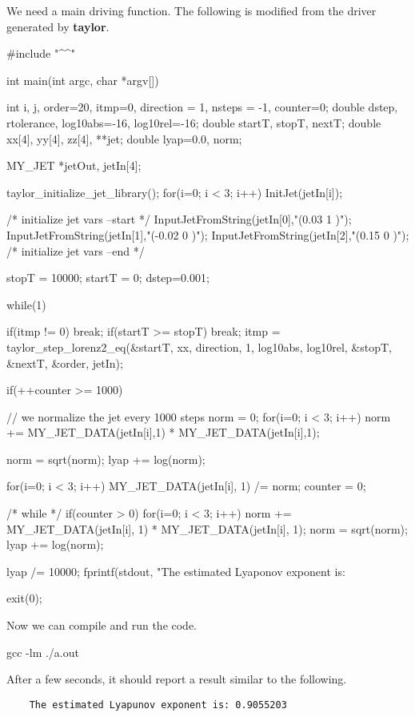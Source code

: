 \documentclass[10pt]{article}
\theoremstyle{remark}
\newcommand{\taylorname}{{\bf taylor}}
\newcommand{\mainfile}{}
\newcommand{\odecfile}{}
\newcommand{\odehfile}{}
\begin{document}
\bigskip
We need a main driving function. The following is modified from the
driver generated by \taylorname{}.
\begin{code}[title={File: \mainfile{}}]
    #include "^\odehfile{}^"
    
    int main(int argc, char *argv[])
    {
      int     i, j, order=20, itmp=0, direction = 1, nsteps = -1, counter=0;
      double  dstep, rtolerance, log10abs=-16, log10rel=-16;
      double  startT, stopT, nextT;
      double  xx[4], yy[4], zz[4], **jet;
      double  lyap=0.0, norm;
    
      MY_JET    *jetOut, jetIn[4];
    
      taylor_initialize_jet_library();
      for(i=0; i < 3; i++) InitJet(jetIn[i]);
      
      /* initialize jet vars --start */
      InputJetFromString(jetIn[0],"(0.03  1 )");
      InputJetFromString(jetIn[1],"(-0.02 0 )");
      InputJetFromString(jetIn[2],"(0.15  0 )");
      /* initialize jet vars --end */
    
      stopT = 10000;
      startT = 0;
      dstep=0.001;
    
      while(1)  {
        if(itmp != 0) {break;}
        if(startT >= stopT) { break;}
        itmp = taylor_step_lorenz2_eq(&startT, xx, direction, 1, 
                                      log10abs, log10rel, 
                                      &stopT, &nextT, &order, jetIn);
    
        if(++counter >= 1000) {  // we normalize the jet every 1000 steps
          norm = 0;
          for(i=0; i < 3; i++)  norm += MY_JET_DATA(jetIn[i],1) * MY_JET_DATA(jetIn[i],1);  
    
          norm = sqrt(norm);
          lyap += log(norm);
    
          for(i=0; i < 3; i++) MY_JET_DATA(jetIn[i], 1) /= norm;
          counter = 0;
        }
      }  /* while */
      if(counter > 0) {
        for(i=0; i < 3; i++) norm += MY_JET_DATA(jetIn[i], 1) *  MY_JET_DATA(jetIn[i], 1); 
        norm = sqrt(norm);
        lyap += log(norm);
      }
    
      lyap /= 10000;
      fprintf(stdout, "The estimated Lyaponov exponent is: %
    
      exit(0);
    }
\end{code}
Now we can compile and run the code.
\begin{command}
    gcc \mainfile{} \odecfile{} -lm
    ./a.out
\end{command}
After a few seconds, it should report a result similar to the
following.
\begin{verbatim}
    The estimated Lyapunov exponent is: 0.9055203
\end{verbatim}%
\end{document}
